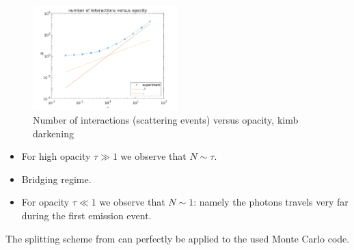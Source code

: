 \documentclass[../main/main.tex]{subfiles}
\begin{document}
	\begin{figure}[!htp]
	\centering
	\includegraphics[width=0.5\textwidth]{../../introductory_exercises/limb_darkening/data/N_vs_opacity.png}
	\caption{Number of interactions (scattering events) versus 	opacity, kimb darkening}
	\label{limb_darkening_N_vs_tau}
	\end{figure}

\begin{itemize}
\item For high opacity $\tau \gg 1$ we observe that $N \sim \tau$. \item Bridging regime.
\item For opacity $\tau \ll 1$ we observe that $N \sim 1$: namely the photons travels very far during the first emission event.
\end{itemize}

The splitting scheme from \cite{Dimarco2018} can perfectly be applied to the used Monte Carlo code.


\noindent{}
\end{document}
